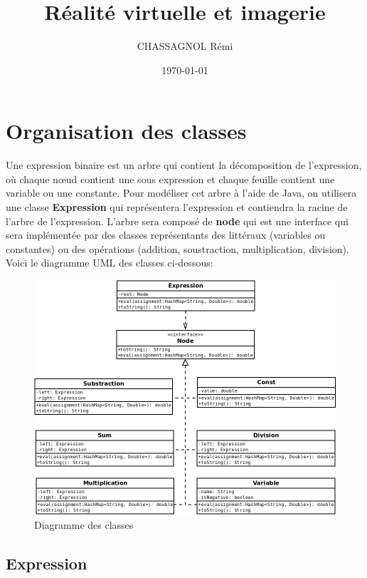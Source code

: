 \documentclass[a4paper]{article}
\title{Réalité virtuelle et imagerie}
\author{CHASSAGNOL Rémi}
\date{\today}
\begin{document}
  \maketitle  

  \section{Organisation des classes}%
  \label{sec:Organisation des classes}

  Une expression binaire est un arbre qui contient la décomposition de
  l'expression, où chaque nœud contient une sous expression et chaque feuille
  contient une variable ou une constante. Pour modéliser cet arbre à l'aide de
  Java, on utilisera une classe \textbf{Expression} qui représentera
  l'expression et contiendra la racine de l'arbre de l'expression. L'arbre sera
  composé de \textbf{node} qui est une interface qui sera implémentée par des
  classes représentants des littéraux (variables ou constantes) ou des
  opérations (addition, soustraction, multiplication, division). Voici le
  diagramme UML des classes ci-dessous:

  \begin{figure}[h]
    \centering
  \includegraphics[scale=0.5]{./Diagram_uml.png}
    \caption{Diagramme des classes}%
    \label{fig:Diagramme des classes}
  \end{figure}

  \subsection{Expression}%
  \label{sub:Expression}
\end{document}
